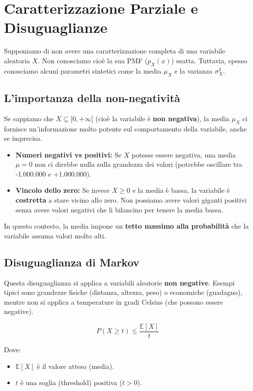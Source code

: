 \section{Caratterizzazione Parziale e Disuguaglianze}

Supponiamo di non avere una caratterizzazione completa di una variabile aleatoria $X$. 
Non conosciamo cioè la sua PMF ($p_X(x)$) esatta. Tuttavia, spesso conosciamo alcuni parametri sintetici come la media $\mu_X$ e la varianza $\sigma_X^2$.

\subsection{L'importanza della non-negatività}
Se sappiamo che $X \subseteq [0, +\infty[$ (cioè la variabile è \textbf{non negativa}), la media $\mu_X$ ci fornisce un'informazione molto potente sul comportamento della variabile, anche se imprecisa.

\begin{itemize}
    \item \textbf{Numeri negativi vs positivi:} Se $X$ potesse essere negativa, una media $\mu=0$ non ci direbbe nulla sulla grandezza dei valori (potrebbe oscillare tra -1.000.000 e +1.000.000).
    \item \textbf{Vincolo dello zero:} Se invece $X \ge 0$ e la media è bassa, la variabile è \textbf{costretta} a stare vicino allo zero. Non possiamo avere valori giganti positivi senza avere valori negativi che li bilancino per tenere la media bassa.
\end{itemize}

In questo contesto, la media impone un \textbf{tetto massimo alla probabilità} che la variabile assuma valori molto alti.

\subsection{Disuguaglianza di Markov}

Questa disuguaglianza si applica a variabili aleatorie \textbf{non negative}. Esempi tipici sono grandezze fisiche (distanza, altezza, peso) o economiche (guadagno), mentre non si applica a temperature in gradi Celsius (che possono essere negative).

\begin{equation}
\boxed{P(X \ge t) \le \frac{\mathbb{E}[X]}{t}}
\end{equation}

Dove:
\begin{itemize}
    \item $\mathbb{E}[X]$ è il valore atteso (media).
    \item $t$ è una soglia (threshold) positiva ($t > 0$).
\end{itemize}

